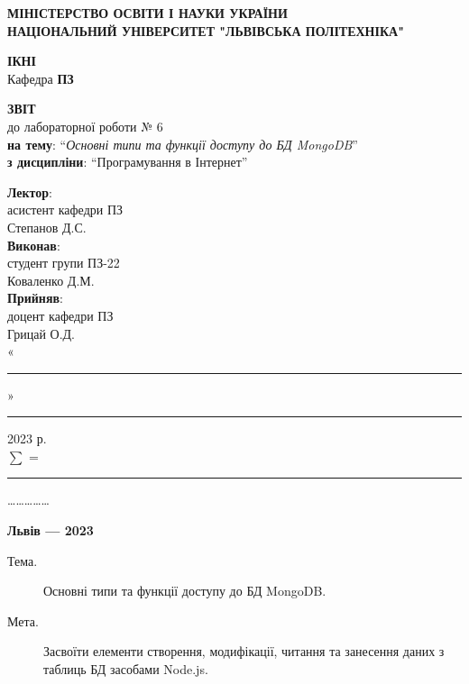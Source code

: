 \documentclass{article}
\newcommand\subject{Програмування в Інтернет}
\newcommand\lecturer{асистент кафедри ПЗ \\ Степанов Д.С.}
\newcommand\teacher{доцент кафедри ПЗ \\ Грицай О.Д.}
\newcommand\mygroup{ПЗ-22}
\newcommand\lab{6}
\newcommand\theme{Основні типи та функції доступу до БД MongoDB}
\newcommand\purpose{Засвоїти елементи створення, модифікації, читання та занесення даних з таблиць БД засобами Node.js}
\begin{document}
\begin{normalsize}
\begin{titlepage}
	\thispagestyle{empty}
	\begin{center}
		\textbf{МІНІСТЕРСТВО ОСВІТИ І НАУКИ УКРАЇНИ\\
			НАЦІОНАЛЬНИЙ УНІВЕРСИТЕТ "ЛЬВІВСЬКА ПОЛІТЕХНІКА"}
	\end{center}
	\begin{flushright}
		\textbf{ІКНІ}\\
		Кафедра \textbf{ПЗ}
	\end{flushright}
	\vspace{200pt}
	\begin{center}
		\textbf{ЗВІТ}\\
		\vspace{10pt}
		до лабораторної роботи № \lab\\
		\textbf{на тему}: “\textit{\theme}”\\
		\textbf{з дисципліни}: “\subject”
	\end{center}
	\vspace{112pt}
	\begin{flushright}
		
		\textbf{Лектор}:\\
		\lecturer\\
		\vspace{28pt}
		\textbf{Виконав}:\\
		
		студент групи \mygroup\\
		Коваленко Д.М.\\
		\vspace{28pt}
		\textbf{Прийняв}:\\
		
		\teacher\\
		
		\vspace{28pt}
		«\rule{1cm}{0.15mm}» \rule{1.5cm}{0.15mm} 2023 р.\\
		$\sum$ = \rule{1cm}{0.15mm}……………\\
		
	\end{flushright}
	\vspace{\fill}
	\begin{center}
		\textbf{Львів — 2023}
	\end{center}
\end{titlepage}
	
\begin{description}
	\item[Тема.] \theme.
	\item[Мета.] \purpose.
\end{description}


\end{normalsize}
\end{document}
